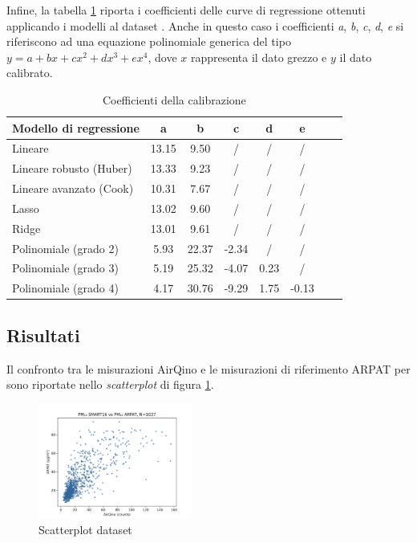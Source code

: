 Infine, la tabella \ref{fig:risultati-pm2.5-coefficienti} riporta i coefficienti delle curve di regressione ottenuti applicando i modelli al dataset . Anche in questo caso i coefficienti \textit{a}, \textit{b}, \textit{c}, \textit{d}, \textit{e} si riferiscono ad una equazione polinomiale generica del tipo $y=a+bx+cx^2+dx^3+ex^4$, dove $x$ rappresenta il dato grezzo e $y$ il dato calibrato.

\begin{table}[H]
    \footnotesize
    \centering
    \begin{tabular}{|l|c|c|c|c|c|c|c|}
    \hline
        \textbf{Modello di regressione} & \textbf{a} & \textbf{b} & \textbf{c} & \textbf{d} & \textbf{e} \\ \hline
        Lineare & 13.15 & 9.50 & / & / & / \\ \hline
        Lineare robusto (Huber) & 13.33 & 9.23 & / & / & / \\ \hline
        Lineare avanzato (Cook) & 10.31 & 7.67 & / & / & / \\ \hline
        Lasso & 13.02 & 9.60 & / & / & / \\ \hline
        Ridge & 13.01 & 9.61 & / & / & / \\ \hline
        Polinomiale (grado 2) & 5.93 & 22.37 & -2.34 & / & / \\ \hline
        Polinomiale (grado 3) & 5.19 & 25.32 & -4.07 & 0.23 & / \\ \hline
        Polinomiale (grado 4) & 4.17 & 30.76 & -9.29 & 1.75 & -0.13 \\ \hline
    \end{tabular}
    \captionsetup{justification=centering}
    \caption{Coefficienti della calibrazione }
    \label{fig:risultati-pm2.5-coefficienti}
\end{table}


\subsection{Risultati }\label{ssec:risultati-pm10}

Il confronto tra le misurazioni AirQino e le misurazioni di riferimento ARPAT per  sono riportate nello \textit{scatterplot} di figura \ref{fig:scatterplot_pm10}.

\begin{figure}[H]
\centering
\includegraphics[width=0.45\textwidth,height=\textheight,keepaspectratio]{img/sc_pm10.png}
\caption{Scatterplot dataset }
\label{fig:scatterplot_pm10}
\end{figure}

